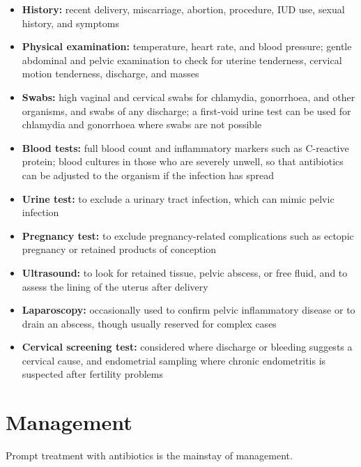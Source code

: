 \begin{itemize}
    \item \textbf{History:} recent delivery, miscarriage, abortion, procedure, IUD use, sexual history, and symptoms
    \item \textbf{Physical examination:} temperature, heart rate, and blood pressure; gentle abdominal and pelvic examination to check for uterine tenderness, cervical motion tenderness, discharge, and masses
    \item \textbf{Swabs:} high vaginal and cervical swabs for chlamydia, gonorrhoea, and other organisms, and swabs of any discharge; a first-void urine test can be used for chlamydia and gonorrhoea where swabs are not possible
    \item \textbf{Blood tests:} full blood count and inflammatory markers such as C-reactive protein; blood cultures in those who are severely unwell, so that antibiotics can be adjusted to the organism if the infection has spread
    \item \textbf{Urine test:} to exclude a urinary tract infection, which can mimic pelvic infection
    \item \textbf{Pregnancy test:} to exclude pregnancy-related complications such as ectopic pregnancy or retained products of conception
    \item \textbf{Ultrasound:} to look for retained tissue, pelvic abscess, or free fluid, and to assess the lining of the uterus after delivery
    \item \textbf{Laparoscopy:} occasionally used to confirm pelvic inflammatory disease or to drain an abscess, though usually reserved for complex cases
    \item \textbf{Cervical screening test:} considered where discharge or bleeding suggests a cervical cause, and endometrial sampling where chronic endometritis is suspected after fertility problems
\end{itemize}

\section*{Management}
Prompt treatment with antibiotics is the mainstay of management.

